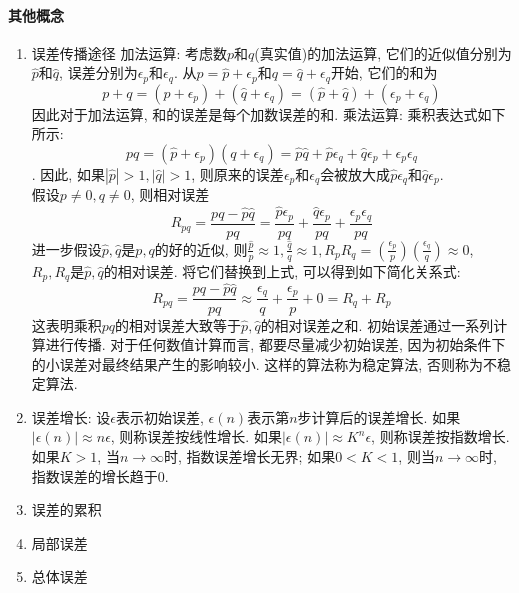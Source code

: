 \documentclass{ctexart}
\begin{document}
	\paragraph{其他概念}
		\begin{enumerate}
			\item 误差传播途径
			\subitem 加法运算: 考虑数$p$和$q$(真实值)的加法运算, 它们的近似值分别为$\hat{p}$和$\hat{q}$, 误差分别为$\epsilon_p$和$\epsilon_q$. 从$p=\hat{p}+\epsilon_p$和$q = \hat{q} + \epsilon_q$开始, 它们的和为
			$$p+q = \left(\hat{p} + \epsilon_p\right) + \left(\hat{q} + \epsilon_q\right) = \left(\hat{p} + \hat{q}\right) + \left(\epsilon_p + \epsilon_q\right)$$
			因此对于加法运算, 和的误差是每个加数误差的和.
			\subitem 乘法运算: 乘积表达式如下所示:
			$$pq = \left(\hat{p}+\epsilon_p\right)\left(q+\epsilon_q\right) = \hat{p}\hat{q} + \hat{p}\epsilon_q + \hat{q}\epsilon_p + \epsilon_p\epsilon_q$$.
			因此, 如果$\left|\hat{p}\right|>1, \left|\hat{q} \right| > 1$, 则原来的误差$\epsilon_p$和$\epsilon_q$会被放大成$\hat{p}\epsilon_q$和$\hat{q}\epsilon_p$. \\
			假设$p \neq 0, q \neq 0$, 则相对误差
			$$R_{pq} = \frac{pq-\hat{p}\hat{q}}{pq} = \frac{\hat{p}\epsilon_p}{pq} + \frac{\hat{q}\epsilon_p}{pq} + \frac{\epsilon_p \epsilon_q}{pq}$$
			进一步假设$\hat{p}, \hat{q}$是$p,q$的好的近似, 则$\frac{\hat{p}}{p}\approx 1, \frac{\hat{q}}{q} \approx 1, R_pR_q = \left(\frac{\epsilon_p}{p}\right) \left(\frac{\epsilon_q}{q}\right) \approx 0$, $R_p,R_q$是$\hat{p},\hat{q}$的相对误差. 将它们替换到上式, 可以得到如下简化关系式:
			$$R_{pq} = \frac{pq - \hat{p}\hat{q}}{pq} \approx \frac{\epsilon_q}{q} + \frac{\epsilon_p}{p} + 0 = R_q + R_p$$
			这表明乘积$pq$的相对误差大致等于$\hat{p},\hat{q}$的相对误差之和.
			\subitem 初始误差通过一系列计算进行传播. 对于任何数值计算而言, 都要尽量减少初始误差, 因为初始条件下的小误差对最终结果产生的影响较小. 这样的算法称为稳定算法, 否则称为不稳定算法.
			\item 误差增长: 
			设$\epsilon$表示初始误差, $\epsilon\left(n\right)$表示第$n$步计算后的误差增长. 如果$\left|\epsilon \left(n\right)\right| \approx n\epsilon$, 则称误差按线性增长. 如果$\left|\epsilon\left(n\right) \right| \approx K^n\epsilon$, 则称误差按指数增长. 如果$K > 1$, 当$n \to \infty$时, 指数误差增长无界; 如果$0 < K < 1$, 则当$n \to \infty$时, 指数误差的增长趋于0.
			\item 误差的累积
			\item 局部误差
			\item 总体误差
		\end{enumerate}
\end{document}
